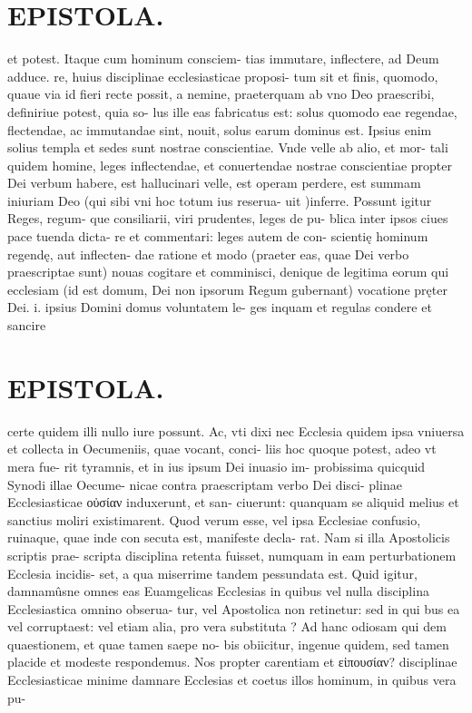 \documentclass{article}
\begin{document}
\begin{pages}
\section*{EPISTOLA. }et potest. Itaque cum hominum consciem- tias immutare, inflectere, ad Deum adduce. re, huius disciplinae ecclesiasticae proposi- tum sit et finis, quomodo, quaue via id fieri recte possit, a nemine, praeterquam ab vno Deo praescribi, definiriue potest, quia so- lus ille eas fabricatus est: solus quomodo eae regendae, flectendae, ac immutandae sint, nouit, solus earum dominus est. Ipsius enim solius templa et sedes sunt nostrae conscientiae. Vnde velle ab alio, et mor- tali quidem homine, leges inflectendae, et conuertendae nostrae conscientiae propter Dei verbum habere, est hallucinari velle, est operam perdere, est summam iniuriam Deo (qui sibi vni hoc totum ius reserua- uit )inferre. Possunt igitur Reges, regum- que consiliarii, viri prudentes, leges de pu- blica inter ipsos ciues pace tuenda dicta- re et commentari: leges autem de con- scientię hominum regendę, aut inflecten- dae ratione et modo (praeter eas, quae Dei verbo praescriptae sunt) nouas cogitare et comminisci, denique de legitima eorum qui ecclesiam (id est domum, Dei non ipsorum Regum gubernant) vocatione pręter Dei. i. ipsius Domini domus voluntatem le- ges inquam et regulas condere et sancire 
\section*{EPISTOLA. }certe quidem illi nullo iure possunt. Ac, vti dixi nec Ecclesia quidem ipsa vniuersa et collecta in Oecumeniis, quae vocant, conci- liis hoc quoque potest, adeo vt mera fue- rit tyramnis, et in ius ipsum Dei inuasio im- probissima quicquid Synodi illae Oecume- nicae contra praescriptam verbo Dei disci- plinae Ecclesiasticae οὐσίαν induxerunt, et san- ciuerunt: quanquam se aliquid melius et sanctius moliri existimarent. Quod verum esse, vel ipsa Ecclesiae confusio, ruinaque, quae inde con secuta est, manifeste decla- rat. Nam si illa Apostolicis scriptis prae- scripta disciplina retenta fuisset, numquam in eam perturbationem Ecclesia incidis- set, a qua miserrime tandem pessundata est. Quid igitur, damnamûsne omnes eas Euamgelicas Ecclesias in quibus vel nulla disciplina Ecclesiastica omnino obserua- tur, vel Apostolica non retinetur: sed in qui bus ea vel corruptaest: vel etiam alia, pro vera substituta ? Ad hanc odiosam qui dem quaestionem, et quae tamen saepe no- bis obiicitur, ingenue quidem, sed tamen placide et modeste respondemus. Nos propter carentiam et εἰπουσίαν? disciplinae Ecclesiasticae minime damnare Ecclesias et coetus illos hominum, in quibus vera pu- 

\end{pages}
\end{document}
